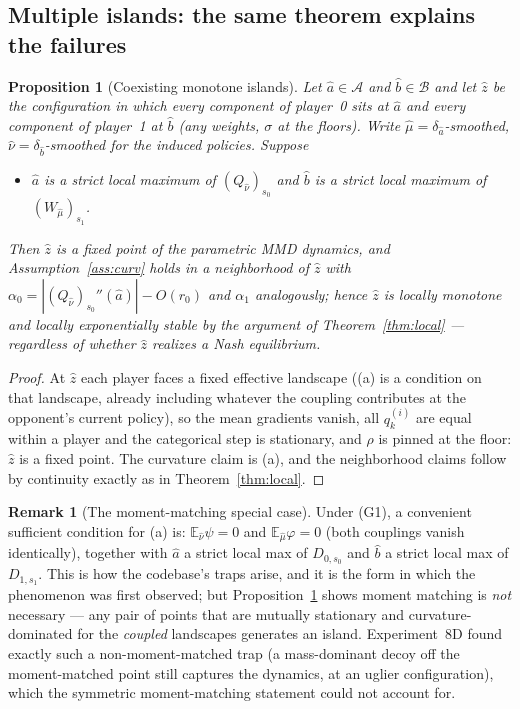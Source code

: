 \documentclass[11pt]{article}
\newtheorem{proposition}{Proposition}
\theoremstyle{definition}
\newtheorem{remark}{Remark}
\newcommand{\E}{\mathbb{E}}
\newcommand{\cA}{\mathcal{A}}
\newcommand{\cB}{\mathcal{B}}
\begin{document}
\subsection{Multiple islands: the same theorem explains the failures}

\begin{proposition}[Coexisting monotone islands]\label{prop:islands}
Let $\hat a \in \cA$ and $\hat b \in \cB$ and let $\hat z$ be the configuration
in which every component of player~0 sits at $\hat a$ and every component of
player~1 at $\hat b$ (any weights, $\sigma$ at the floors). Write
$\hat\mu = \delta_{\hat a}$-smoothed, $\hat\nu = \delta_{\hat b}$-smoothed for
the induced policies. Suppose
\begin{itemize}
\item[(a)] $\hat a$ is a strict local maximum of $(Q_{\hat\nu})_{s_0}$ and
$\hat b$ is a strict local maximum of $(W_{\hat\mu})_{s_1}$.
\end{itemize}
Then $\hat z$ is a fixed point of the parametric MMD dynamics, and
Assumption~\ref{ass:curv} holds in a neighborhood of $\hat z$ with
$\alpha_0 = |(Q_{\hat\nu})_{s_0}''(\hat a)| - O(r_0)$ and $\alpha_1$
analogously; hence $\hat z$ is locally monotone and locally exponentially
stable by the argument of Theorem~\ref{thm:local} --- \emph{regardless of
whether $\hat z$ realizes a Nash equilibrium}.
\end{proposition}

\begin{proof}
At $\hat z$ each player faces a fixed effective landscape ((a) is a condition
on that landscape, already including whatever the coupling contributes at the
opponent's current policy), so the mean gradients vanish, all $q^{(i)}_k$ are
equal within a player and the categorical step is stationary, and $\rho$ is
pinned at the floor: $\hat z$ is a fixed point. The curvature claim is (a), and
the neighborhood claims follow by continuity exactly as in
Theorem~\ref{thm:local}.
\end{proof}

\begin{remark}[The moment-matching special case]\label{rem:momentmatch}
Under (G1), a convenient sufficient condition for (a) is: $\E_{\hat\nu}\psi =
0$ and $\E_{\hat\mu}\varphi = 0$ (both couplings vanish identically), together
with $\hat a$ a strict local max of $D_{0,s_0}$ and $\hat b$ a strict local max
of $D_{1,s_1}$. This is how the codebase's traps arise, and it is the form in
which the phenomenon was first observed; but Proposition~\ref{prop:islands}
shows moment matching is \emph{not} necessary --- any pair of points that are
mutually stationary and curvature-dominated for the \emph{coupled} landscapes
generates an island. Experiment~8D found exactly such a non-moment-matched
trap (a mass-dominant decoy off the moment-matched point still captures the
dynamics, at an uglier configuration), which the symmetric moment-matching
statement could not account for.
\end{remark}
\end{document}
